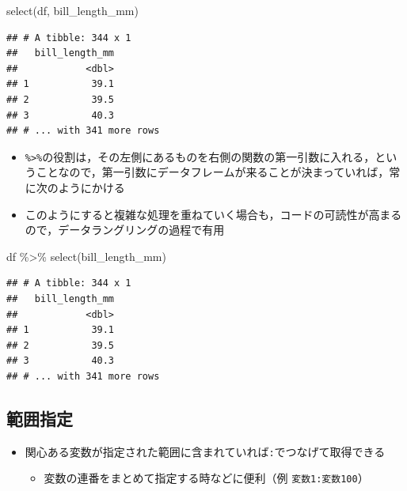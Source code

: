 \documentclass[
  xelatex,ja=standard, b5paper]{bxjsbook}
\newenvironment{Shaded}{\begin{snugshade}}{\end{snugshade}}
\newcommand{\FunctionTok}[1]{\textcolor[rgb]{0.00,0.00,0.00}{#1}}
\newcommand{\NormalTok}[1]{#1}
\newcommand{\SpecialCharTok}[1]{\textcolor[rgb]{0.00,0.00,0.00}{#1}}
\providecommand{\tightlist}{%
  \setlength{\itemsep}{0pt}\setlength{\parskip}{0pt}}
\begin{document}
\begin{Shaded}
\begin{Highlighting}[]
\FunctionTok{select}\NormalTok{(df, bill\_length\_mm)}
\end{Highlighting}
\end{Shaded}

\begin{verbatim}
## # A tibble: 344 x 1
##   bill_length_mm
##            <dbl>
## 1           39.1
## 2           39.5
## 3           40.3
## # ... with 341 more rows
\end{verbatim}

\begin{itemize}
\tightlist
\item
  \texttt{\%\textgreater{}\%}の役割は，その左側にあるものを右側の関数の第一引数に入れる，ということなので，第一引数にデータフレームが来ることが決まっていれば，常に次のようにかける
\item
  このようにすると複雑な処理を重ねていく場合も，コードの可読性が高まるので，データラングリングの過程で有用
\end{itemize}

\begin{Shaded}
\begin{Highlighting}[]
\NormalTok{df }\SpecialCharTok{\%\textgreater{}\%} 
  \FunctionTok{select}\NormalTok{(bill\_length\_mm)}
\end{Highlighting}
\end{Shaded}

\begin{verbatim}
## # A tibble: 344 x 1
##   bill_length_mm
##            <dbl>
## 1           39.1
## 2           39.5
## 3           40.3
## # ... with 341 more rows
\end{verbatim}

\hypertarget{select-range}{%
\subsection{範囲指定}\label{select-range}}

\begin{itemize}
\tightlist
\item
  関心ある変数が指定された範囲に含まれていれば\texttt{:}でつなげて取得できる

  \begin{itemize}
  \tightlist
  \item
    変数の連番をまとめて指定する時などに便利（例 \texttt{変数1:変数100}）
  \end{itemize}
\end{itemize}
\end{document}
